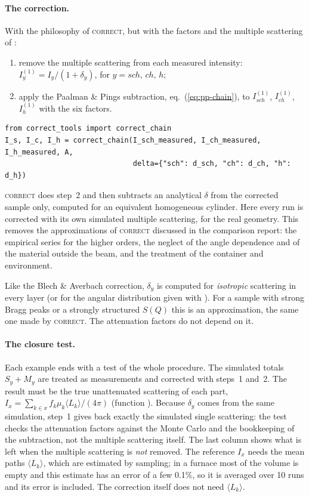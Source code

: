 \paragraph{The correction.} With the philosophy of \textsc{correct}, but with the factors and the multiple scattering of \mcams:
\begin{enumerate}
  \item remove the multiple scattering from each measured intensity:
        $I_y^{(1)} = I_y / (1+\delta_y)$, for $y = sch,\,ch,\,h$;
  \item apply the Paalman \& Pings subtraction, eq.~(\ref{eq:pp-chain}), to $I_{sch}^{(1)}$, $I_{ch}^{(1)}$, $I_h^{(1)}$ with the
        six factors.
\end{enumerate}
\begin{lstlisting}
from correct_tools import correct_chain
I_s, I_c, I_h = correct_chain(I_sch_measured, I_ch_measured, I_h_measured, A,
                              delta={"sch": d_sch, "ch": d_ch, "h": d_h})
\end{lstlisting}
\textsc{correct} does step~2 and then subtracts an analytical $\delta$ from the corrected sample only, computed for an equivalent
homogeneous cylinder. Here every run is corrected with its own simulated multiple scattering, for the real geometry. This removes the
approximations of \textsc{correct} discussed in the comparison report: the empirical series for the higher orders, the neglect of the
angle dependence and of the material outside the beam, and the treatment of the container and environment.

\begin{note}
Like the Blech \& Averbach correction, $\delta_y$ is computed for \emph{isotropic} scattering in every layer (or for the angular
distribution given with ). For a sample with strong Bragg peaks or a strongly structured $S(Q)$ this is an
approximation, the same one made by \textsc{correct}. The attenuation factors do not depend on it.
\end{note}

\paragraph{The closure test.} Each example ends with a test of the whole procedure. The simulated totals $S_y+M_y$ are treated as
measurements and corrected with steps~1 and~2. The result must be the true unattenuated scattering of each part,
$I_x = \sum_{k\in x} f_k\mu_k\langle L_k\rangle/(4\pi)$ (function ). Because $\delta_y$ comes from the same
simulation, step~1 gives back exactly the simulated single scattering: the test checks the attenuation factors against the Monte
Carlo and the bookkeeping of the subtraction, not the multiple scattering itself. The last column shows what is left when the multiple
scattering is \emph{not} removed. The reference $I_x$ needs the mean paths $\langle L_k\rangle$, which are estimated by sampling; in a
furnace most of the volume is empty and this estimate has an error of a few 0.1\%, so it is averaged over 10 runs and its error is
included. The correction itself does not need $\langle L_k\rangle$.

